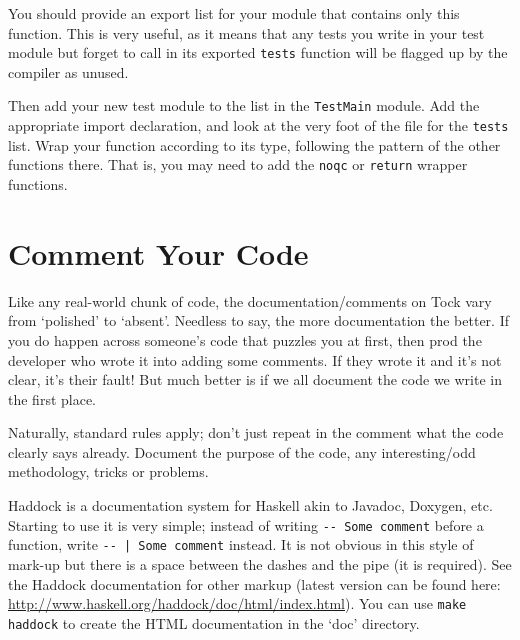 \documentclass[a4wide]{article}
\begin{document}
You should provide an export list for your module that contains only this function.  This is very useful,
as it means that any tests you write in your test module but forget to call in its exported 
\lstinline|tests| function will be flagged up by the compiler as unused.

Then add your new test module to the list in the \lstinline|TestMain| module.  Add the appropriate import
declaration, and look at the very foot of the file for the \lstinline|tests| list.  Wrap your function
according to its type, following the pattern of the other functions there.  That is, you may need to
add the \lstinline|noqc| or \lstinline|return| wrapper functions.

\section{Comment Your Code}

Like any real-world chunk of code, the documentation/comments on Tock vary from `polished' to `absent'.
Needless to say, the more documentation the better.  If you do happen across someone's code that puzzles
you at first, then prod the developer who wrote it into adding some comments.  If they wrote it and it's
not clear, it's their fault!  But much better is if we all document the code we write in the first place.

Naturally, standard rules apply; don't just repeat in the comment what the code clearly says already.
Document the purpose of the code, any interesting/odd methodology, tricks or problems.

Haddock is a documentation system for Haskell akin to Javadoc, Doxygen, etc.  Starting to use it is very
simple; instead of writing \lstinline|-- Some comment| before a function, write \lstinline$-- | Some comment$
instead.  It is not obvious in this style of mark-up but there is a space between the dashes and the pipe (it is 
required).  See the Haddock documentation for other markup (latest version can be found here:
\url{http://www.haskell.org/haddock/doc/html/index.html}).  You can use \verb$make haddock$ to create the
HTML documentation in the `doc' directory.
\end{document}
